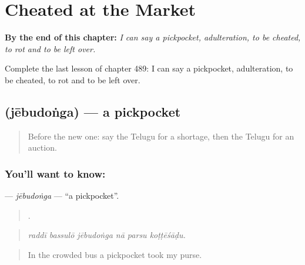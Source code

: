 
\chapter{Cheated at the Market}
\label{ch:te-cheated-at-the-market}

\begin{chapteropening}
\textbf{By the end of this chapter:} \emph{I can say a pickpocket, adulteration, to be cheated, to rot and to be left over.}

Complete the last lesson of chapter 489: I can say a pickpocket, adulteration, to be cheated, to rot and to be left over.
\end{chapteropening}

\section[\texorpdfstring{\te{జేబుదొంగ} (jēbudoṅga)}{జేబుదొంగ (jēbudoṅga)}]{ (jēbudoṅga) — a pickpocket}

\label{lesson:TE-C489-jebudonga}



\begin{quote}
Before the new one: say the Telugu for a shortage, then the Telugu for an auction.
\end{quote}

\subsection*{You'll want to know: }
\textbf{} — \emph{jēbudoṅga} — \textquotedblleft{}a pickpocket\textquotedblright{}.

\begin{quote}
     .
\end{quote}

\begin{quote}
\emph{raddī bassulō jēbudoṅga nā parsu koṭṭēśāḍu.}
\end{quote}

\begin{quote}
In the crowded bus a pickpocket took my purse.
\end{quote}

